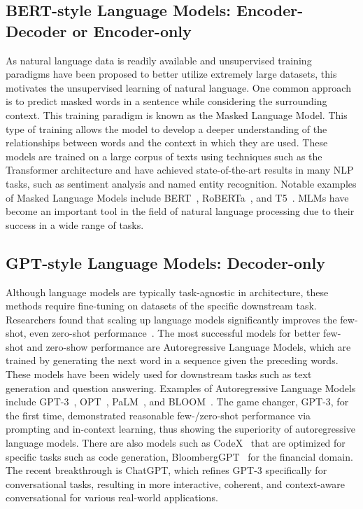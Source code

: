 \documentclass[manuscript,screen, nonacm]{acmart}
\begin{document}
\subsection{BERT-style Language Models: Encoder-Decoder or Encoder-only}


As natural language data is readily available and unsupervised training paradigms have been proposed to better utilize extremely large datasets, this motivates the unsupervised learning of natural language. One common approach is to predict masked words in a sentence while considering the surrounding context. This training paradigm is known as the Masked Language Model. This type of training allows the model to develop a deeper understanding of the relationships between words and the context in which they are used.  These models are trained on a large corpus of texts using techniques such as the Transformer architecture and have achieved state-of-the-art results in many NLP tasks, such as sentiment analysis and named entity recognition. Notable examples of Masked Language Models include BERT~\cite{devlin2018bert}, RoBERTa~\cite{liu2019roberta}, and T5~\cite{2020t5}. MLMs have become an important tool in the field of natural language processing due to their success in a wide range of tasks.






\subsection{GPT-style Language Models: Decoder-only}

Although language models are typically task-agnostic in architecture, these methods require fine-tuning on datasets of the specific downstream task. Researchers found that scaling up language models significantly improves the few-shot, even zero-shot performance~\citep{brown2020language}. The most successful models for better few-shot and zero-show performance are Autoregressive Language Models, which are trained by generating the next word in a sequence given the preceding words. These models have been widely used for downstream tasks such as text generation and question answering. Examples of Autoregressive Language Models include GPT-3~\cite{brown2020language}, OPT~\cite{zhang2022opt}, PaLM~\cite{chowdhery2022palm}, and BLOOM~\cite{scao2022bloom}. The game changer, GPT-3, for the first time, demonstrated reasonable few-/zero-shot performance via prompting and in-context learning,  
thus showing the superiority of autoregressive language models. There are also models such as CodeX~\cite{codex} that are optimized for specific tasks such as code generation, BloombergGPT~\cite{wu2023bloomberggpt} for the financial domain. The recent breakthrough is ChatGPT, which refines GPT-3 specifically for conversational tasks, resulting in more interactive, coherent, and context-aware conversational for various real-world applications.
\end{document}
